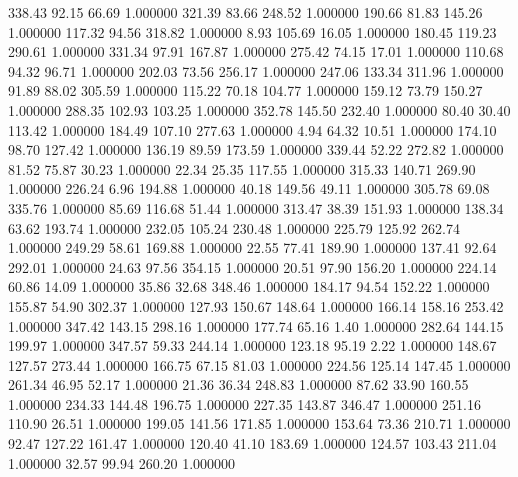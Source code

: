     338.43     92.15     66.69  1.000000
    321.39     83.66    248.52  1.000000
    190.66     81.83    145.26  1.000000
    117.32     94.56    318.82  1.000000
      8.93    105.69     16.05  1.000000
    180.45    119.23    290.61  1.000000
    331.34     97.91    167.87  1.000000
    275.42     74.15     17.01  1.000000
    110.68     94.32     96.71  1.000000
    202.03     73.56    256.17  1.000000
    247.06    133.34    311.96  1.000000
     91.89     88.02    305.59  1.000000
    115.22     70.18    104.77  1.000000
    159.12     73.79    150.27  1.000000
    288.35    102.93    103.25  1.000000
    352.78    145.50    232.40  1.000000
     80.40     30.40    113.42  1.000000
    184.49    107.10    277.63  1.000000
      4.94     64.32     10.51  1.000000
    174.10     98.70    127.42  1.000000
    136.19     89.59    173.59  1.000000
    339.44     52.22    272.82  1.000000
     81.52     75.87     30.23  1.000000
     22.34     25.35    117.55  1.000000
    315.33    140.71    269.90  1.000000
    226.24      6.96    194.88  1.000000
     40.18    149.56     49.11  1.000000
    305.78     69.08    335.76  1.000000
     85.69    116.68     51.44  1.000000
    313.47     38.39    151.93  1.000000
    138.34     63.62    193.74  1.000000
    232.05    105.24    230.48  1.000000
    225.79    125.92    262.74  1.000000
    249.29     58.61    169.88  1.000000
     22.55     77.41    189.90  1.000000
    137.41     92.64    292.01  1.000000
     24.63     97.56    354.15  1.000000
     20.51     97.90    156.20  1.000000
    224.14     60.86     14.09  1.000000
     35.86     32.68    348.46  1.000000
    184.17     94.54    152.22  1.000000
    155.87     54.90    302.37  1.000000
    127.93    150.67    148.64  1.000000
    166.14    158.16    253.42  1.000000
    347.42    143.15    298.16  1.000000
    177.74     65.16      1.40  1.000000
    282.64    144.15    199.97  1.000000
    347.57     59.33    244.14  1.000000
    123.18     95.19      2.22  1.000000
    148.67    127.57    273.44  1.000000
    166.75     67.15     81.03  1.000000
    224.56    125.14    147.45  1.000000
    261.34     46.95     52.17  1.000000
     21.36     36.34    248.83  1.000000
     87.62     33.90    160.55  1.000000
    234.33    144.48    196.75  1.000000
    227.35    143.87    346.47  1.000000
    251.16    110.90     26.51  1.000000
    199.05    141.56    171.85  1.000000
    153.64     73.36    210.71  1.000000
     92.47    127.22    161.47  1.000000
    120.40     41.10    183.69  1.000000
    124.57    103.43    211.04  1.000000
     32.57     99.94    260.20  1.000000
